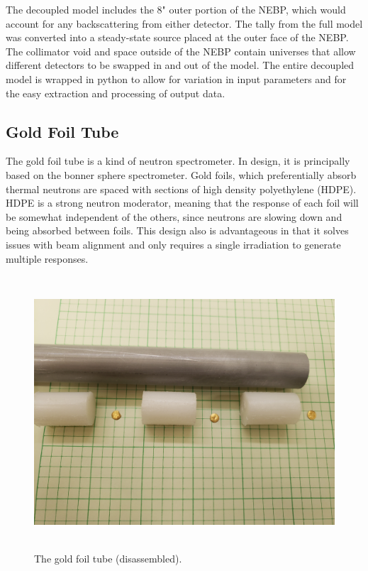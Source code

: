 The decoupled model includes the 8" outer portion of the NEBP, which would account for any backscattering from either detector.
The tally from the full model was converted into a steady-state source placed at the outer face of the NEBP.
The collimator void and space outside of the NEBP contain universes that allow different detectors to be swapped in and out of the model.
The entire decoupled model is wrapped in python to allow for variation in input parameters and for the easy extraction and processing of output data.


\subsection{Gold Foil Tube}

The gold foil tube is a kind of neutron spectrometer.
In design, it is principally based on the bonner sphere spectrometer.
Gold foils, which preferentially absorb thermal neutrons are spaced with sections of high density polyethylene (HDPE).
HDPE is a strong neutron moderator, meaning that the response of each foil will be somewhat independent of the others, since neutrons are slowing down and being absorbed between foils.
This design also is advantageous in that it solves issues with beam alignment and only requires a single irradiation to generate multiple responses.

\begin{figure}[htb]
\centering
\includegraphics[height=4in]{tex/figures/foil_tube.jpg}
\caption[Gold Foil Tube]{The gold foil tube (disassembled).}
\label{fig:foil_tube}
\end{figure}


